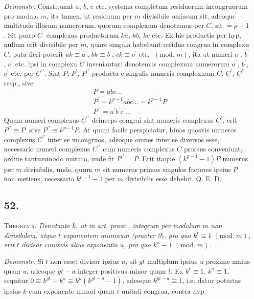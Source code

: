 \documentclass[twoside,12pt, showframe]{memoir}
\renewcommand{\pmod}[1]{\;(\textrm{mod.}\;#1)}
\begin{document}
\textit{Demonstr.} Constituant \(a\), \(b\), \(c\) etc. systema completum residuorum incongruorum pro modulo \(m\), ita tamen, ut residuum per \(m\) divisibile omissum sit, adeoque multitudo illorum numerorum, quorum complexum denotamus per \(C\), sit \(=p-1\). Sit porro \(C^{\prime}\) complexus productorum \(k a\), \(k b\), \(k c\) etc. Ex his productis per hyp. nullum erit divisibile per \(m\), quare singula habebunt residua congrua in complexu \(C\), puta fieri poterit \(a k \equiv a^{\prime}\), \(b k \equiv b^{\prime}\), \(c k \equiv c^{\prime}\) etc. \(\pmod{m}\), ita ut numeri \(a^{\prime}\), \(b^{\prime}\), \(c^{\prime}\) etc. ipsi in complexu \(C\) inveniantur: denotemus complexum numerorum \(a^{\prime}\), \(b^{\prime}\), \(c^{\prime}\) etc. per \(C^{\prime \prime}\). Sint \(P\), \(P^{\prime}\), \(P^{\prime \prime}\) producta e singulis numeris complexuum \(C\), \(C^{\prime}\), \(C^{\prime \prime}\) resp., sive
\[\begin{aligned}
& P=a b c \ldots \\
& P^{\prime}=k^{p-1} a b c \ldots=k^{p-1} P \\
& P^{\prime \prime}=a^{\prime} b^{\prime} c^{\prime} \ldots
\end{aligned}\]
Quum numeri complexus \(C^{\prime \prime}\) deinceps congrui sint numeris complexus \(C^{\prime}\), erit \(P^{\prime \prime} \equiv P^{\prime}\) sive \(P^{\prime \prime} \equiv k^{p-1} P\). At quum facile perspiciatur, binos quosvis numeros complexus \(C^{\prime \prime}\) inter se incongruos, adeoque omnes inter se diversos esse, necessario numeri complexus \(C^{\prime \prime}\) cum numeris complexus \(C\) prorsus conveniunt, ordine tantummodo mutato, unde fit \(P^{\prime \prime}=P\). Erit itaque \((k^{p-1}-1) P\) numerus per \(m\) divisibilis, unde, quum \(m\) sit numerus primus singulos factores ipsius \(P\) non metiens, necessario \(k^{p-1}-1\) per \(m\) divisibilis esse debebit. Q. E. D.

\subsection*{52.}
 
\textsc{Theorema.} \textit{Denotante \(k\), ut in art. praec., integrum per modulum \(m\) non divisibilem, atque \(t\) exponentem minimum (praeter 0\()\), pro quo \(k^{t} \equiv 1\pmod{m}\), erit \(t\) divisor cuiusvis alius exponentis \(u\), pro quo \(k^{u} \equiv 1\pmod{m}\).}\clearpage\noindent%
 
\textit{Demonstr.} Si \(t\) non esset divisor ipsius \(u\), sit \(g t\) multiplum ipsius \(u\) proxime maius quam \(u\), adeoque \(g t-u\) integer positivus minor quam \(t\). Ex \(k^{t} \equiv 1\), \(k^{u} \equiv 1\), sequitur \(0 \equiv k^{g t}-k^{u} \equiv k^{u}(k^{g t-u}-1)\), adeoque \(k^{g t-u} \equiv 1\), i.e. datur potestas ipsius \(k\) cum exponente minori quam \(t\) unitati congrua, contra hyp.
 
\end{document}
